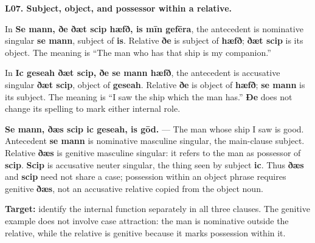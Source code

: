 \par\begin{minipage}{\linewidth}\raggedright
\textbf{L07. Subject, object, and possessor within a relative.}

In \textbf{Se mann, ðe ðæt scip hæfð, is mīn gefēra}, the antecedent is nominative singular \textbf{se mann}, subject of \textbf{is}. Relative \textbf{ðe} is subject of \textbf{hæfð}; \textbf{ðæt scip} is its object. The meaning is “The man who has that ship is my companion.”

In \textbf{Ic geseah ðæt scip, ðe se mann hæfð}, the antecedent is accusative singular \textbf{ðæt scip}, object of \textbf{geseah}. Relative \textbf{ðe} is object of \textbf{hæfð}; \textbf{se mann} is its subject. The meaning is “I saw the ship which the man has.” \textbf{Ðe} does not change its spelling to mark either internal role.

\textbf{Se mann, ðæs scip ic geseah, is gōd.} — The man whose ship I saw is good. Antecedent \textbf{se mann} is nominative masculine singular, the main-clause subject. Relative \textbf{ðæs} is genitive masculine singular: it refers to the man as possessor of \textbf{scip}. \textbf{Scip} is accusative neuter singular, the thing seen by subject \textbf{ic}. Thus \textbf{ðæs} and \textbf{scip} need not share a case; possession within an object phrase requires genitive \textbf{ðæs}, not an accusative relative copied from the object noun.

\textbf{Target:} identify the internal function separately in all three clauses. The genitive example does not involve case attraction: the man is nominative outside the relative, while the relative is genitive because it marks possession within it.

\end{minipage}\par\addvspace{4pt}

